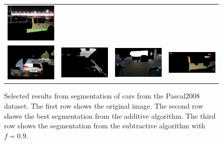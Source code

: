\documentclass[10pt,twocolumn,letterpaper]{article}
\begin{document}
\begin{figure}[p]
\begin{tabular}{ p{4cm} p{4cm} p{4cm} p{4cm} }
\includegraphics[width=3.95cm]{figures/results/a2008_002198.jpg.eps} \\
\includegraphics[width=3.95cm]{figures/results/b2008_000052.jpg.eps} &
\includegraphics[width=3.95cm]{figures/results/b2008_000828.jpg.eps} &
\includegraphics[width=3.95cm]{figures/results/b2008_000952.jpg.eps} &
\includegraphics[width=3.95cm]{figures/results/b2008_002198.jpg.eps} \\
\end{tabular}
\caption{Selected results from segmentation of cars from the Pascal2008 
dataset.  The first row shows the original image.  The second row shows
the best segmentation from the additive algorithm.  The third row shows
the segmentation from the subtractive algorithm with $f=0.9$.}
\label{fig:good_results}
\end{figure}
\end{document}
